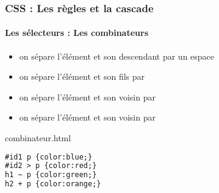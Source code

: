 \documentclass[xcolor=table]{beamer}
\begin{document}
\begin{frame}[fragile]
\frametitle{CSS : Les règles et la cascade}
\framesubtitle{Les sélecteurs : Les combinateurs}

\begin{minipage}{0.60\textwidth} 
	\begin{itemize}
		\item {} on sépare l'élément et son descendant par un espace
		\item {} on sépare l'élément et son fils par \keyword{>}
		\item {} on sépare l'élément et son voisin par \keyword{\textasciitilde}
		\item {} on sépare l'élément et son voisin par \keyword{+}
	\end{itemize}
\end{minipage}
%
\begin{minipage}{0.38\textwidth}
\begin{block}{combinateur.html}
\lstset{escapeinside=**}
\scriptsize\bfseries
\begin{lstlisting}[language={html}]
#id1 p {color:blue;}
#id2 > p {color:red;}
h1 ~ p {color:green;}
h2 + p {color:orange;}
\end{lstlisting}
\end{block}
\end{minipage}
\end{frame}
\end{document}
